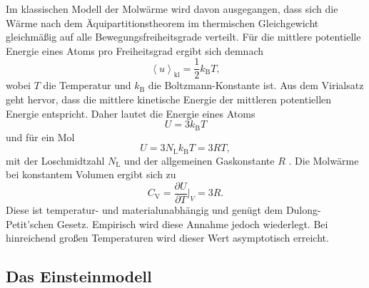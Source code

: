 Im klassischen Modell der Molwärme wird davon ausgegangen, dass sich die Wärme nach dem Äquipartitionstheorem im thermischen Gleichgewicht gleichmäßig auf alle Bewegungsfreiheitsgrade verteilt.
Für die mittlere potentielle Energie eines Atoms pro Freiheitsgrad ergibt sich demnach
\begin{equation}
  \left\langle u \right\rangle_{\text{kl}} = \frac{1}{2}k_{\text{B}}T,
\end{equation}
wobei $T$ die Temperatur und $k_{\text{B}}$ die Boltzmann-Konstante \cite{scipy} ist.
Aus dem Virialsatz geht hervor, dass die mittlere kinetische Energie der mittleren potentiellen Energie entspricht.
Daher lautet die Energie eines Atoms
\begin{equation}
  U = 3k_{\text{B}}T
\end{equation}
und für ein Mol
\begin{equation}
  U = 3N_{\text{L}}k_{\text{B}}T = 3RT,
\end{equation}
mit der Loschmidtzahl $N_{\text{L}}$ und der allgemeinen Gaskonstante $R$ \cite{scipy}.
Die Molwärme bei konstantem Volumen ergibt sich zu
\begin{equation}
  C_{\text{V}} = \frac{\partial U}{\partial T}\biggr|_V = 3R.
\end{equation}
Diese ist temperatur- und materialunabhängig und genügt dem Dulong-Petit'schen Gesetz.
Empirisch wird diese Annahme jedoch wiederlegt.
Bei hinreichend großen Temperaturen wird dieser Wert asymptotisch erreicht.

\subsection{Das Einsteinmodell}

